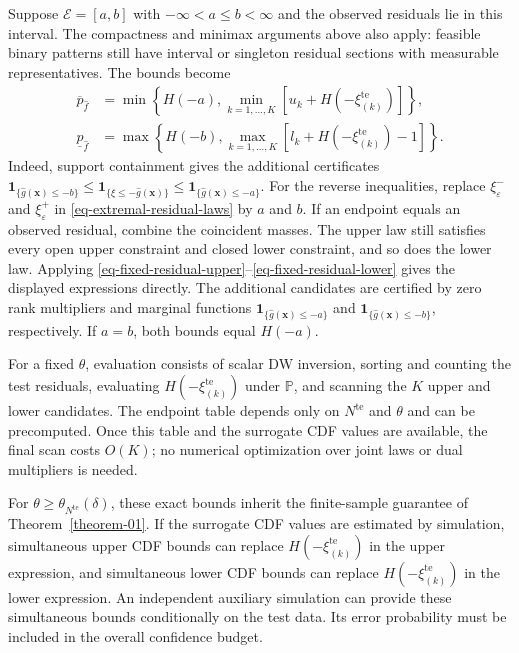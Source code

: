 \documentclass[review,11pt,3p,authoryear,nopreprintline]{elsarticle}
\begin{document}
\begin{remark}
  \label{rem-interval-support}
  Suppose $\mathcal E=[a,b]$ with $-\infty<a\le b<\infty$ and the observed residuals lie in this interval. The compactness and minimax arguments above also apply: feasible binary patterns still have interval or singleton residual sections with measurable representatives. The bounds become
  \begin{align}
    \overline p_{\hat f}
    &=\min\left\{H(-a),\min_{k=1,\ldots,K}\left[u_k+H\left(-\xi_{(k)}^{\mathrm{te}}\right)\right]\right\},
    \label{eq-dw-interval-upper}\\
    \underline p_{\hat f}
    &=\max\left\{H(-b),\max_{k=1,\ldots,K}\left[l_k+H\left(-\xi_{(k)}^{\mathrm{te}}\right)-1\right]\right\}.
    \label{eq-dw-interval-lower}
  \end{align}
  Indeed, support containment gives the additional certificates
  $\mathbf1_{\{\hat g(\bm x)\le-b\}}\le\mathbf1_{\{\xi\le-\hat g(\bm x)\}}\le\mathbf1_{\{\hat g(\bm x)\le-a\}}$.
  For the reverse inequalities, replace $\xi^-_\varepsilon$ and $\xi^+_\varepsilon$ in \eqref{eq-extremal-residual-laws} by $a$ and $b$. If an endpoint equals an observed residual, combine the coincident masses. The upper law still satisfies every open upper constraint and closed lower constraint, and so does the lower law. Applying \eqref{eq-fixed-residual-upper}--\eqref{eq-fixed-residual-lower} gives the displayed expressions directly. The additional candidates are certified by zero rank multipliers and marginal functions $\mathbf1_{\{\hat g(\bm x)\le-a\}}$ and $\mathbf1_{\{\hat g(\bm x)\le-b\}}$, respectively. If $a=b$, both bounds equal $H(-a)$.
\end{remark}

For a fixed $\theta$, evaluation consists of scalar DW inversion, sorting and counting the test residuals, evaluating $H\left(-\xi_{(k)}^{\mathrm{te}}\right)$ under $\mathbb P$, and scanning the $K$ upper and lower candidates. The endpoint table depends only on $N^{\mathrm{te}}$ and $\theta$ and can be precomputed. Once this table and the surrogate CDF values are available, the final scan costs $O(K)$; no numerical optimization over joint laws or dual multipliers is needed.

For $\theta\ge\theta_{N^{\mathrm{te}}}(\delta)$, these exact bounds inherit the finite-sample guarantee of Theorem~\ref{theorem-01}. If the surrogate CDF values are estimated by simulation, simultaneous upper CDF bounds can replace $H\left(-\xi_{(k)}^{\mathrm{te}}\right)$ in the upper expression, and simultaneous lower CDF bounds can replace $H\left(-\xi_{(k)}^{\mathrm{te}}\right)$ in the lower expression. An independent auxiliary simulation can provide these simultaneous bounds conditionally on the test data. Its error probability must be included in the overall confidence budget.




\end{document}

